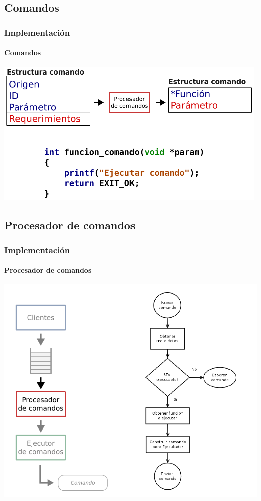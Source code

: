\documentclass[xcolor=dvipsnames]{beamer}
\begin{document}
    \subsection{Comandos}
    \begin{frame}
        \frametitle{Implementación}
        \framesubtitle{Comandos}
        \begin{center}
            \includegraphics[width=0.99\textwidth]{img/implementacion_comandos.pdf}
        \end{center}
        
    \end{frame}
    
    \subsection{Procesador de comandos}
    \begin{frame}
        \frametitle{Implementación}
        \framesubtitle{Procesador de comandos}
        \begin{center}
            \includegraphics[height=0.99\textheight]{img/implementacion_dispatcher.pdf}
        \end{center}
        
    \end{frame}
    
\end{document}
